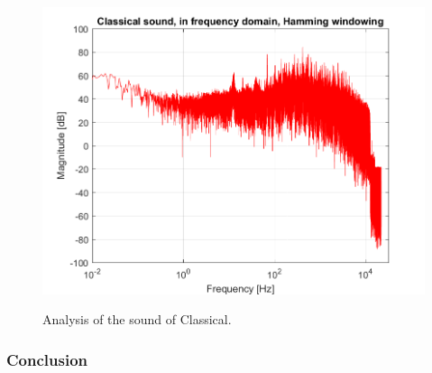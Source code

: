 \begin{figure}[htb!]
	{\includegraphics[width=0.45\linewidth]{code/Classical_figure5.png}}
	\caption{Analysis of the sound of Classical.}\label{fig:klassisk}
\end{figure}

\subsubsection{Conclusion}



